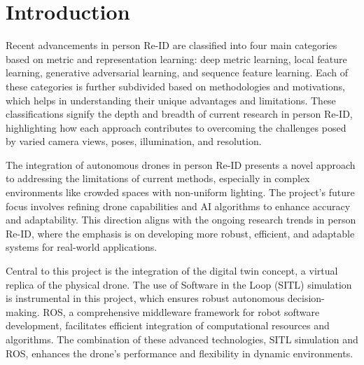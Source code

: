 \section{Introduction}

Recent advancements in person Re-ID are classified into four main categories based on metric and representation learning: deep metric learning, local feature learning, generative adversarial learning, and sequence feature learning. Each of these categories is further subdivided based on methodologies and motivations, which helps in understanding their unique advantages and limitations. These classifications signify the depth and breadth of current research in person Re-ID, highlighting how each approach contributes to overcoming the challenges posed by varied camera views, poses, illumination, and resolution\cite{1a1}.

The integration of autonomous drones in person Re-ID presents a novel approach to addressing the limitations of current methods, especially in complex environments like crowded spaces with non-uniform lighting. The project's future focus involves refining drone capabilities and AI algorithms to enhance accuracy and adaptability. This direction aligns with the ongoing research trends in person Re-ID, where the emphasis is on developing more robust, efficient, and adaptable systems for real-world applications.

Central to this project is the integration of the digital twin concept, a virtual replica of the physical drone. The use of Software in the Loop (SITL) simulation is instrumental in this project, which ensures robust autonomous decision-making. ROS, a comprehensive middleware framework for robot software development, facilitates efficient integration of computational resources and algorithms. The combination of these advanced technologies, SITL simulation and ROS, enhances the drone's performance and flexibility in dynamic environments.